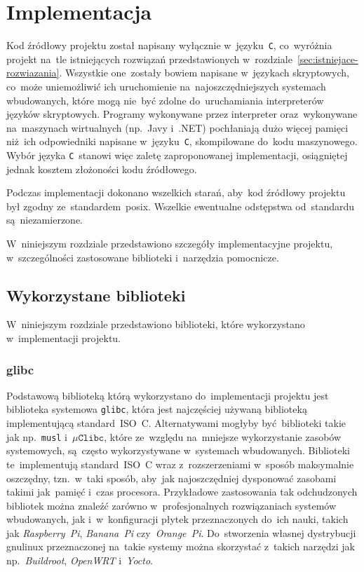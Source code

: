 \documentclass[thesis]{subfiles}
\begin{document}
\chapter{Implementacja}
\label{chapter:implementacja}

Kod źródłowy projektu został napisany wyłącznie w~języku~\texttt{C}, co~wyróżnia projekt na~tle istniejących rozwiązań przedstawionych w~rozdziale~\ref{sec:istniejace-rozwiazania}. Wszystkie one~zostały bowiem napisane w~językach skryptowych, co~może uniemożliwić ich uruchomienie na~najoszczędniejszych systemach wbudowanych, które mogą nie~być zdolne do~uruchamiania interpreterów języków skryptowych. Programy wykonywane przez interpreter oraz~wykonywane na~maszynach wirtualnych (np.~Javy i~.NET) pochłaniają dużo więcej pamięci niż~ich odpowiedniki napisane w~języku~\texttt{C}, skompilowane do~kodu maszynowego. Wybór języka \texttt{C}~stanowi więc zaletę zaproponowanej implementacji, osiągniętej jednak kosztem złożoności kodu źródłowego.

Podczas implementacji dokonano wszelkich starań, aby~kod źródłowy projektu był zgodny ze~standardem~\gls{posix}. Wszelkie ewentualne odstępstwa od~standardu są~niezamierzone.

W~niniejszym rozdziale przedstawiono szczegóły implementacyjne projektu, w~szczególności zastosowane biblioteki i~narzędzia pomocnicze.


\section{Wykorzystane biblioteki}

W~niniejszym rozdziale przedstawiono biblioteki, które wykorzystano w~implementacji projektu.


\subsection{glibc}

Podstawową biblioteką którą wykorzystano do~implementacji projektu jest biblioteka systemowa \texttt{glibc}, która jest najczęściej używaną biblioteką implementującą standard~ISO~C. Alternatywami mogłyby być~biblioteki takie jak np.~\texttt{musl} i~$\mu\texttt{Clibc}$, które ze~względu na~mniejsze wykorzystanie zasobów systemowych, są~często wykorzystywane w~systemach wbudowanych. Biblioteki te~implementują standard~ISO~C wraz z~rozszerzeniami w~sposób maksymalnie oszczędny, tzn.~w~taki sposób, aby~jak najoszczędniej dysponować zasobami takimi jak~pamięć i~czas procesora. Przykładowe zastosowania tak odchudzonych bibliotek można znaleźć zarówno w~profesjonalnych rozwiązaniach systemów wbudowanych, jak i~w~konfiguracji płytek przeznaczonych do~ich nauki, takich jak \emph{Raspberry~Pi}, \emph{Banana~Pi} czy~\emph{Orange~Pi}. Do~stworzenia własnej dystrybucji \gls{gnulinux} przeznaczonej na~takie systemy można skorzystać z~takich narzędzi jak np.~\emph{Buildroot}, \emph{OpenWRT} i~\emph{Yocto}.
\end{document}
